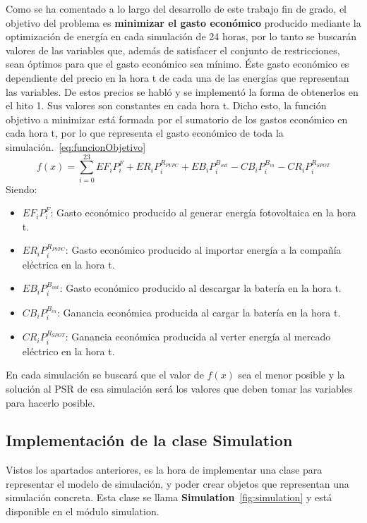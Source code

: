 Como se ha comentado a lo largo del desarrollo de este trabajo fin de grado, el objetivo del problema es \textbf{minimizar el gasto económico} producido mediante la optimización de energía en cada simulación de 24 horas, por lo tanto se buscarán valores de las variables que, además de satisfacer el conjunto de restricciones, sean óptimos para que el gasto económico sea mínimo. Éste gasto económico es dependiente del precio en la hora t de cada una de las energías que representan las variables. De estos precios se habló y se implementó la forma de obtenerlos en el hito 1. Sus valores son constantes en cada hora t. Dicho esto, la función objetivo a minimizar está formada por el sumatorio de los gastos económico en cada hora t, por lo que representa el gasto económico de toda la simulación.~\ref{eq:funcionObjetivo}
\begin{equation}
\label{eq:funcionObjetivo}
f(x) = \sum_{i=0}^{23} EF_{i}P_{i}^{F} + ER_{i}P_{i}^{R_{PVPC}} + EB_{i}P_{i}^{B_{out}} - CB_{i}P_{i}^{B_{in}} - CR_{i}P_{i}^{R_{SPOT}}
\end{equation}
Siendo:
\begin{itemize}
\item $ EF_{i}P_{i}^{F} $: Gasto económico producido al generar energía fotovoltaica en la hora t.
\item $ ER_{i}P_{i}^{R_{PVPC}} $: Gasto económico producido al importar energía a la compañía eléctrica en la hora t.
\item $ EB_{i}P_{i}^{B_{out}} $: Gasto económico producido al descargar la batería en la hora t.
\item $ CB_{i}P_{i}^{B_{in}} $: Ganancia económica producida al cargar la batería en la hora t.
\item $ CR_{i}P_{i}^{R_{SPOT}} $: Ganancia económica producida al verter energía al mercado eléctrico en la hora t.
\end{itemize}

En cada simulación se buscará que el valor de $ f(x) $ sea el menor posible y la solución al PSR de esa simulación será los valores que deben tomar las variables para hacerlo posible.

\subsection{Implementación de la clase Simulation}
Vistos los apartados anteriores, es la hora de implementar una clase para representar el modelo de simulación, y poder crear objetos que representan una simulación concreta. Esta clase se llama \textbf{Simulation}~\ref{fig:simulation} y está disponible en el módulo simulation.\\

